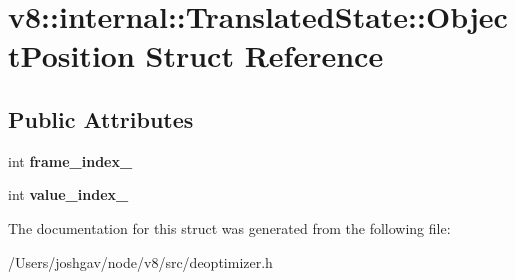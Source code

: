 \hypertarget{structv8_1_1internal_1_1_translated_state_1_1_object_position}{}\section{v8\+:\+:internal\+:\+:Translated\+State\+:\+:Object\+Position Struct Reference}
\label{structv8_1_1internal_1_1_translated_state_1_1_object_position}
\subsection*{Public Attributes}
\begin{DoxyCompactItemize}
\item 
int {\bfseries frame\+\_\+index\+\_\+}\hypertarget{structv8_1_1internal_1_1_translated_state_1_1_object_position_a3e255d239f923f0f3e7c41745977b9c8}{}\label{structv8_1_1internal_1_1_translated_state_1_1_object_position_a3e255d239f923f0f3e7c41745977b9c8}

\item 
int {\bfseries value\+\_\+index\+\_\+}\hypertarget{structv8_1_1internal_1_1_translated_state_1_1_object_position_a9c5c53e41cdf44d710c2593c642f883f}{}\label{structv8_1_1internal_1_1_translated_state_1_1_object_position_a9c5c53e41cdf44d710c2593c642f883f}

\end{DoxyCompactItemize}


The documentation for this struct was generated from the following file\+:\begin{DoxyCompactItemize}
\item 
/\+Users/joshgav/node/v8/src/deoptimizer.\+h\end{DoxyCompactItemize}
